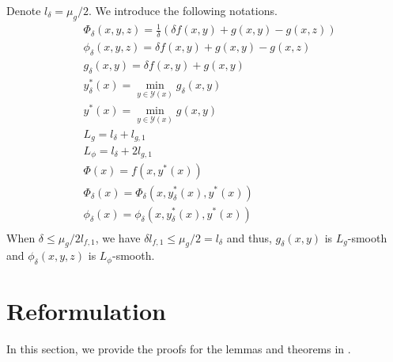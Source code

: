 \documentclass{article}
\newcommand{\Yc}{\mathcal{Y}}
\theoremstyle{plain}
\theoremstyle{definition}
\theoremstyle{remark}
\begin{document}
Denote $l_{\delta}=\mu_g/2$. We introduce the following notations.
\begin{align*}
    &\Phi_{\delta}(x, y, z) = \frac{1}{\delta} \left(  \delta f(x,y) + g(x,y) -  g(x,z) \right)\\
    &\phi_\delta(x, y, z)=\delta f(x,y) + g(x,y) -  g(x,z)\\
    &g_{\delta}(x,y) = \delta f(x,y) + g(x,y)\\
    &y^*_\delta(x)=\min_{y \in \Yc(x)} g_{\delta}(x,y)\\
    &y^*(x)=\min_{y \in \Yc(x)} g(x,y)\\
    &L_g=l_\delta+l_{g,1}\\
    &L_\phi=l_\delta+2l_{g,1}\\
    &\Phi(x)=f(x, y^*(x))\\
    &\Phi_\delta(x)=\Phi_{\delta}(x, y^*_\delta(x), y^*(x))\\
    &\phi_\delta(x)=\phi_{\delta}(x, y^*_\delta(x), y^*(x))\\
\end{align*}
When $\delta\leq \mu_g/2l_{f,1}$, we have $\delta l_{f,1}\leq \mu_g/2=l_{\delta}$ and thus,  $g_{\delta}(x,y)$ is $L_g$-smooth and $\phi_\delta(x,y,z)$ is $L_\phi$-smooth.


\section{Reformulation}\label{app: Reformulation}
In this section, we provide the proofs for the lemmas and theorems in .
\end{document}
